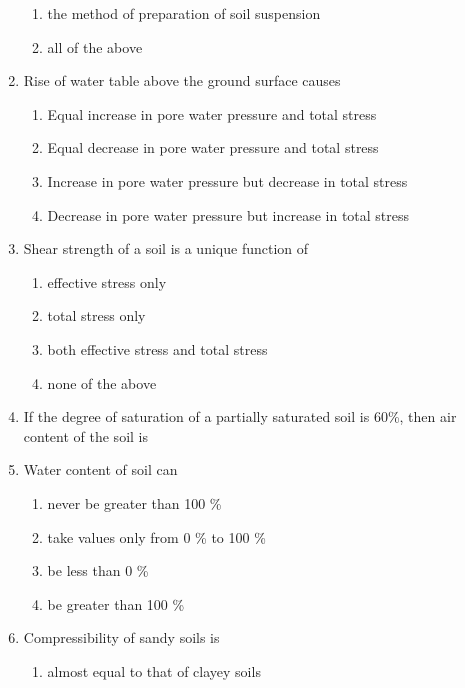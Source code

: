 \documentclass[11pt,a4paper]{article}
\begin{document}
\begin{enumerate}
\begin{enumerate}[label=\Alph*.]
\item{the method of preparation of soil suspension}
\item{all of the above}
\end{enumerate}
\item{Rise of water table above the ground surface causes}
\begin{enumerate}[label=\Alph*.]
\item{Equal increase in pore water pressure and total stress}
\item{Equal decrease in pore water pressure and total stress}
\item{Increase in pore water pressure but decrease in total stress}
\item{Decrease in pore water pressure but increase in total stress}
\end{enumerate}
\item{Shear strength of a soil is a unique function of}
\begin{enumerate}[label=\Alph*.]
\item{effective stress only}
\item{total stress only}
\item{both effective stress and total stress}
\item{none of the above}
\end{enumerate}
\item{If the degree of saturation of a partially saturated soil is 60\%, then air content of the soil is}
\\
\item{Water content of soil can}
\begin{enumerate}[label=\Alph*.]
\item{never be greater than 100 \%}
\item{take values only from 0 \% to 100 \%}
\item{be less than 0 \%}
\item{be greater than 100 \%}
\end{enumerate}
\item{Compressibility of sandy soils is}
\begin{enumerate}[label=\Alph*.]
\item{almost equal to that of clayey soils}

\end{enumerate}
\end{enumerate}
\end{document}
